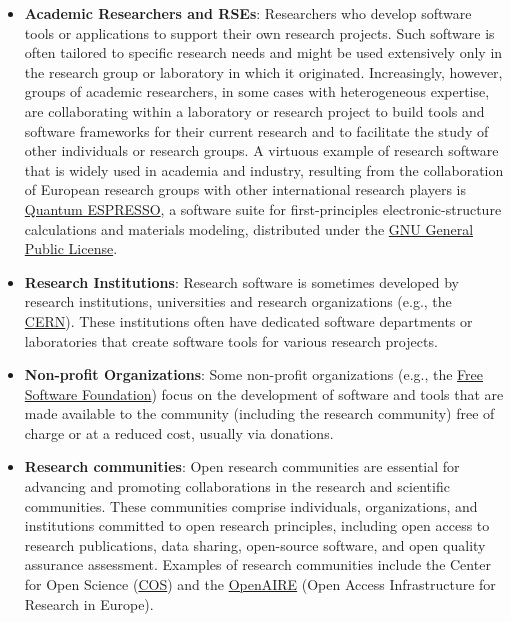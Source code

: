 \begin{itemize}
    \item \textbf{Academic Researchers and RSEs}: Researchers who develop software tools or applications to support their own research projects. Such software is often tailored to specific research needs and might be used extensively only in the research group or laboratory in which it originated. Increasingly, however, groups of academic researchers, in some cases with heterogeneous expertise, are collaborating within a laboratory or research project to build tools and software frameworks for their current research and to facilitate the study of other individuals or research groups. A virtuous example of research software that is widely used in academia and industry, resulting from the collaboration of European research groups with other international research players is \href{https://foundation.quantum-espresso.org/}{Quantum ESPRESSO}, a software suite for first-principles electronic-structure calculations and materials modeling, distributed under the \href{https://www.gnu.org/licenses/}{GNU General Public License}.

    \item \textbf{Research Institutions}: Research software is sometimes developed by research institutions, universities and research organizations (e.g., the \href{https://home.web.cern.ch/}{CERN}). These institutions often have dedicated software departments or laboratories that create software tools for various research projects.

    \item \textbf{Non-profit Organizations}: Some non-profit organizations (e.g., the \href{https://www.fsf.org/}{Free Software Foundation}) focus on the development of software and tools that are made available to the community (including the research community) free of charge or at a reduced cost, usually via donations.

    \item \textbf{Research communities}: Open research communities are essential for advancing and promoting collaborations in the research and scientific communities. These communities comprise individuals, organizations, and institutions committed to open research principles, including open access to research publications, data sharing, open-source software, and open quality assurance assessment. Examples of research communities include the Center for Open Science (\href{https://www.cos.io/}{COS}) and the \href{https://www.openaire.eu/}{OpenAIRE} (Open Access Infrastructure for Research in Europe).
\end{itemize}

